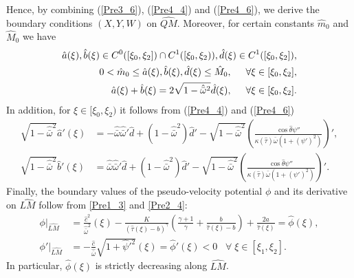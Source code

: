 \documentclass[3p,11pt]{elsarticle}
\numberwithin{equation}{section}
\begin{document}
Hence, by combining (\ref{Pre3_6}), (\ref{Pre4_4}) and (\ref{Pre4_6}), we derive the boundary conditions $({X},{ Y},W)$ on $\widehat{QM}$. Moreover, for certain constants $\hat m_0$ and $\hat M_0$ we have
\begin{equation}\label{Pre4_7}
    \begin{split}
        \hat a(\xi),\hat b(\xi) \in C^0([\xi_0,\xi_2])\cap C^1([\xi_0,\xi_2)), \hat d(\xi)\in C^1([\xi_0,\xi_2]),\\
        0<\hat m_0\leq \hat a(\xi),\hat b(\xi), \hat d(\xi)\leq \hat M_0, \hspace{5mm} \forall \xi\in[\xi_0,\xi_2],\\
        \hat a(\xi)+\hat b(\xi)=2\sqrt{1-\hat{\bar\omega}^2} \hat d(\xi), \hspace{5mm} \forall \xi\in[\xi_0,\xi_2].   
    \end{split}
\end{equation}
In addition, for $\xi\in[\xi_0,\xi_2)$ it follows from (\ref{Pre4_4}) and (\ref{Pre4_6})
\begin{equation}\label{Pre4_8}
    \begin{split}
        \sqrt{1-\hat{\bar\omega}^2}\hat a'(\xi) &= -\hat{\bar\omega}\hat{\bar\omega}'\hat d+(1-\hat{\bar\omega}^2)\hat d'-\sqrt{1-\hat{\bar\omega}^2}\left(\frac{\cos\hat\theta\psi''}{\kappa(\hat\tau)\bar\omega(1+(\psi')^2)} \right)',\\
        \sqrt{1-\hat{\bar\omega}^2}\hat b'(\xi) &= \hat{\bar\omega}\hat{\bar\omega}'\hat d+(1-\hat{\bar\omega}^2)\hat d'-\sqrt{1-\hat{\bar\omega}^2}\left(\frac{\cos\hat\theta\psi''}{\kappa(\hat\tau)\bar\omega(1+(\psi')^2)} \right)'.
    \end{split}
\end{equation}
Finally, the boundary values of the pseudo-velocity potential $\phi$ and its derivative on $\widehat{LM}$ follow from \eqref{Pre1_3} and \eqref{Pre2_4}:
\begin{equation*}\label{Pre4_9}
    \begin{split}
        \phi|_{\widehat{LM}}& = \frac{\hat c^2}{\hat{\bar\omega}^2}(\xi) -\frac{K}{(\hat\tau(\xi)-b)^\gamma}\left(\frac{\gamma+1}{\gamma}+\frac{b}{\hat\tau(\xi)-b} \right) +\frac{2a}{\hat\tau(\xi)}= \hat\phi(\xi),\\
        \phi'|_{\widehat{LM}}& =-\frac{\hat c}{\hat{\bar\omega}}\sqrt{1+\hat\psi'^2}(\xi)=\hat\phi' (\xi)<0  \; \; \; \forall \; \xi\in[\xi_1,\xi_2].
    \end{split}
\end{equation*}
In particular, $\hat\phi(\xi)$ is strictly decreasing along $\widehat{LM}$.
\end{document}
